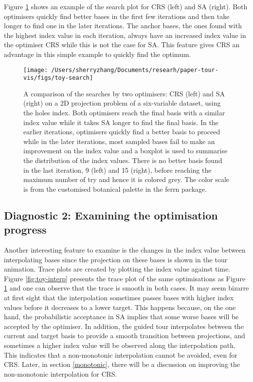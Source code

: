 Figure \ref{fig:toy-search} shows an example of the search plot for CRS
(left) and SA (right). Both optimisers quickly find better bases in the
first few iterations and then take longer to find one in the later
iterations. The anchor bases, the ones found with the highest index
value in each iteration, always have an increased index value in the
optimiser CRS while this is not the case for SA. This feature gives CRS
an advantage in this simple example to quickly find the optimum.

\begin{Schunk}
\begin{figure}

{\centering \texttt{[image: /Users/sherryzhang/Documents/researh/paper-tour-vis/figs/toy-search]} 

}

\caption[A comparison of the searches by two optimisers]{A comparison of the searches by two optimisers: CRS (left) and SA (right) on a 2D projection problem of a six-variable dataset,  using the holes index. Both optimisers reach the final basis with a similar index value while it takes SA longer to find the final basis. In the earlier iterations, optimisers quickly find a better basis to proceed while in the later iterations, most sampled bases fail to make an improvement on the index value and a boxplot is used to summarise the distribution of the index values. There is no better basis found in the last iteration, 9 (left) and 15 (right), before reaching the maximum number of try and hence it is colored grey. The color scale is from the customised botanical palette in the ferrn package.}\label{fig:toy-search}
\end{figure}
\end{Schunk}

\hypertarget{toy-interp}{%
\subsection{Diagnostic 2: Examining the optimisation
progress}\label{toy-interp}}

Another interesting feature to examine is the changes in the index value
between interpolating bases since the projection on these bases is shown
in the tour animation. Trace plots are created by plotting the index
value against time. Figure \ref{fig:toy-interp} presents the trace plot
of the same optimisations as Figure \ref{fig:toy-search} and one can
observe that the trace is smooth in both cases. It may seem bizarre at
first sight that the interpolation sometimes passes bases with higher
index values before it decreases to a lower target. This happens
because, on the one hand, the probabilistic acceptance in SA implies
that some worse bases will be accepted by the optimiser. In addition,
the guided tour interpolates between the current and target basis to
provide a smooth transition between projections, and sometimes a higher
index value will be observed along the interpolation path. This
indicates that a non-monotonic interpolation cannot be avoided, even for
CRS. Later, in section \ref{monotonic}, there will be a discussion on
improving the non-monotonic interpolation for CRS.

